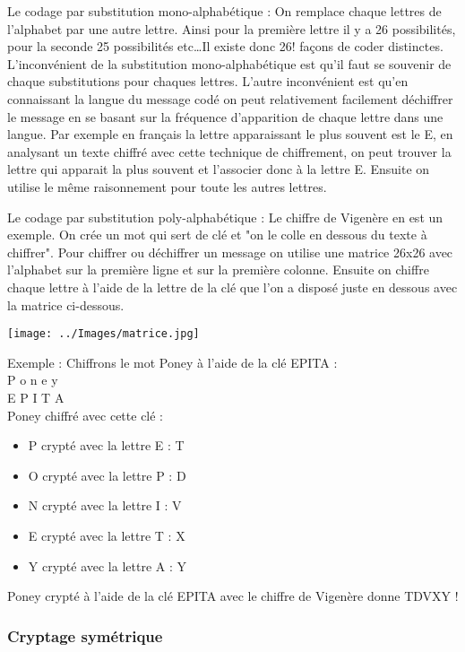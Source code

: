 \documentclass[a4paper,12pt]{article}
\begin{document}
	Le codage par substitution mono-alphabétique : On remplace chaque lettres de l'alphabet par une autre lettre. Ainsi pour la première lettre il y a 26 possibilités, pour la seconde 25 possibilités etc\dots Il existe donc 26! façons de coder distinctes. L'inconvénient de la substitution mono-alphabétique est qu'il faut se souvenir de chaque substitutions pour chaques lettres. L'autre inconvénient est qu'en connaissant la langue du message codé on peut relativement facilement déchiffrer le message en se basant sur la fréquence d'apparition de chaque lettre dans une langue. Par exemple en français la lettre apparaissant le plus souvent est le E, en analysant un texte chiffré avec cette technique de chiffrement, on peut trouver la lettre qui apparait la plus souvent et l'associer donc à la lettre E. Ensuite on utilise le même raisonnement pour toute les autres lettres.

	Le codage par substitution poly-alphabétique : Le chiffre de Vigenère en est un exemple. On crée un mot qui sert de clé et "on le colle en dessous du texte à chiffrer". Pour chiffrer ou déchiffrer un message on utilise une matrice 26x26 avec l'alphabet sur la première ligne et sur la première colonne. Ensuite on chiffre chaque lettre à l'aide de la lettre de la clé que l'on a disposé juste en dessous avec la matrice ci-dessous.
\begin{center}
	\texttt{[image: ../Images/matrice.jpg]} 
\end{center}
	Exemple : Chiffrons le mot Poney à l'aide de la clé EPITA : \\ P o n e y \\E P I T A \\
	Poney chiffré avec cette clé : 
\begin{itemize}
\item P crypté avec la lettre E : T
\item O crypté avec la lettre P : D
\item N crypté avec la lettre I : V
\item E crypté avec la lettre T : X
\item Y crypté avec la lettre A : Y
\end{itemize}
	Poney crypté à l'aide de la clé EPITA avec le chiffre de Vigenère donne TDVXY !

			\subsubsection{Cryptage symétrique}
\end{document}
